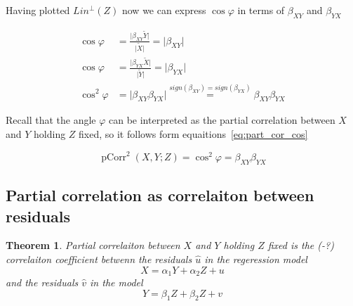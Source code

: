 \documentclass[nobib]{tufte-handout}
\DeclareMathOperator{\pCorr}{pCorr}
\newtheorem{theorem}{Theorem}
\theoremstyle{definition}
\begin{document}
Having plotted $Lin^{\perp}(Z)$ now we can express $\cos \varphi$ in terms of $\beta_{XY}$
and $\beta_{YX}$

\begin{equation}\label{eq:part_cor_cos}
\begin{split}
\cos \varphi &= \frac{\vert \beta_{XY} \widetilde Y \vert}{\vert \widetilde X \vert} = \vert \beta_{XY} \vert \\
\cos \varphi &= \frac{\vert \beta_{YX} \widetilde X \vert}{\vert \widetilde Y \vert} = \vert \beta_{YX} \vert \\
\cos^2 \varphi &= \vert \beta_{XY} \beta_{YX} \vert \stackrel{sign(\beta_{XY}) = sign(\beta_{YX})}{=} \beta_{XY} \beta_{YX}
\end{split}
\end{equation}

Recall that the angle $\varphi$ can be interpreted as the partial correlation
between $X$ and $Y$ holding $Z$ fixed, so it follows form equaitions~\eqref{eq:part_cor_cos}

\[
\pCorr^2(X,Y; Z) = \cos^2 \varphi = \beta_{XY} \beta_{YX}
\]

\subsection{Partial correlation as correlaiton between residuals}


\begin{theorem}
Partial correlaiton between $X$ and $Y$ holding $Z$ fixed is the (-?)
correlaiton coefficient betwenn the residuals $\hat u$ in the regeression model
\[
X = \alpha_1 Y + \alpha_2 Z + u
\]
and the residuals $\hat v$ in the model
\[
Y = \beta_1 Z + \beta_2 Z + v
\]
\end{theorem}
\end{document}
